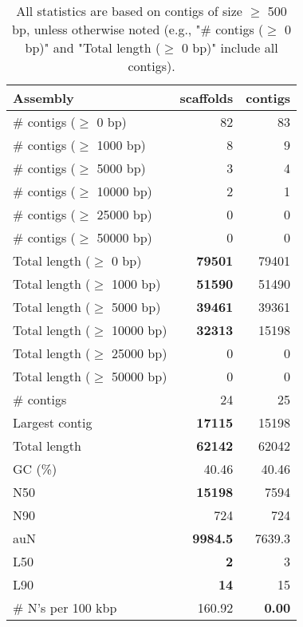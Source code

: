 \documentclass[12pt,a4paper]{article}
\begin{document}
\begin{table}[ht]
\begin{center}
\caption{All statistics are based on contigs of size $\geq$ 500 bp, unless otherwise noted (e.g., "\# contigs ($\geq$ 0 bp)" and "Total length ($\geq$ 0 bp)" include all contigs).}
\begin{tabular}{|l*{2}{|r}|}
\hline
Assembly & scaffolds & contigs \\ \hline
\# contigs ($\geq$ 0 bp) & 82 & 83 \\ \hline
\# contigs ($\geq$ 1000 bp) & 8 & 9 \\ \hline
\# contigs ($\geq$ 5000 bp) & 3 & 4 \\ \hline
\# contigs ($\geq$ 10000 bp) & 2 & 1 \\ \hline
\# contigs ($\geq$ 25000 bp) & 0 & 0 \\ \hline
\# contigs ($\geq$ 50000 bp) & 0 & 0 \\ \hline
Total length ($\geq$ 0 bp) & {\bf 79501} & 79401 \\ \hline
Total length ($\geq$ 1000 bp) & {\bf 51590} & 51490 \\ \hline
Total length ($\geq$ 5000 bp) & {\bf 39461} & 39361 \\ \hline
Total length ($\geq$ 10000 bp) & {\bf 32313} & 15198 \\ \hline
Total length ($\geq$ 25000 bp) & 0 & 0 \\ \hline
Total length ($\geq$ 50000 bp) & 0 & 0 \\ \hline
\# contigs & 24 & 25 \\ \hline
Largest contig & {\bf 17115} & 15198 \\ \hline
Total length & {\bf 62142} & 62042 \\ \hline
GC (\%) & 40.46 & 40.46 \\ \hline
N50 & {\bf 15198} & 7594 \\ \hline
N90 & 724 & 724 \\ \hline
auN & {\bf 9984.5} & 7639.3 \\ \hline
L50 & {\bf 2} & 3 \\ \hline
L90 & {\bf 14} & 15 \\ \hline
\# N's per 100 kbp & 160.92 & {\bf 0.00} \\ \hline
\end{tabular}
\end{center}
\end{table}
\end{document}
